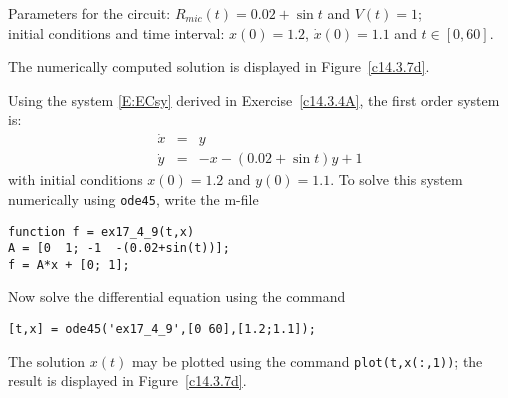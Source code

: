 \documentclass{ximera}
\begin{document}
\begin{exercise} \label{c14.3.7d}
Parameters for the circuit: $R_{mic}(t) = 0.02+\sin t$ and $V(t) = 1$;\\
initial conditions and time interval: $x(0) = 1.2$, $\dot{x}(0) = 1.1$ and 
$t\in[0,60]$.

\begin{solution}
\ans The numerically computed solution is displayed in 
Figure~\ref{c14.3.7d}.

\soln  Using the system \eqref{E:ECsy} derived in 
Exercise~\ref{c14.3.4A}, the first order system is:
\begin{eqnarray*}
\dot{x} & = & y \\
\dot{y} & = & -x - (0.02+\sin t)y + 1
\end{eqnarray*}
with initial conditions $x(0)=1.2$ and $y(0)=1.1$.   To solve this system numerically 
using {\tt ode45}, write the m-file
\begin{verbatim}
function f = ex17_4_9(t,x)
A = [0  1; -1  -(0.02+sin(t))];
f = A*x + [0; 1];
\end{verbatim}
Now solve the differential equation using the command
\begin{verbatim}
[t,x] = ode45('ex17_4_9',[0 60],[1.2;1.1]);
\end{verbatim}
The solution $x(t)$ may be plotted using the command {\tt plot(t,x(:,1))}; the 
result is displayed in Figure~\ref{c14.3.7d}.
\begin{figure}[htb]
     \centerline{%
     }
\end{figure} 





\end{solution}
\end{exercise}
\end{document}
